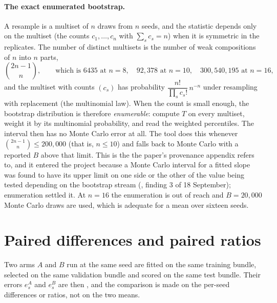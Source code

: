 \paragraph{The exact enumerated bootstrap.}
A resample is a multiset of $n$ draws from $n$ seeds, and the statistic depends only
on the multiset (the counts $c_1,\dots,c_n$ with $\sum_sc_s=n$) when it is symmetric in
the replicates. The number of distinct multisets is the number of weak compositions
of $n$ into $n$ parts,
\begin{equation}
  \binom{2n-1}{n},\qquad\text{which is }6435\text{ at }n=8,\quad 92{,}378\text{ at }n=10,\quad 300{,}540{,}195\text{ at }n=16,
\end{equation}
and the multiset with counts $(c_s)$ has probability $\dfrac{n!}{\prod_sc_s!}\,n^{-n}$
under resampling with replacement (the multinomial law). When the count is small
enough, the bootstrap distribution is therefore \emph{enumerable}: compute $T$ on every
multiset, weight it by its multinomial probability, and read the weighted percentiles.
The interval then has no Monte Carlo error at all. The tool
 does this whenever $\binom{2n-1}{n}\le200{,}000$
(that is, $n\le10$) and falls back to Monte Carlo with a reported $B$ above that limit.
This is the  the paper's provenance appendix refers to,
and it entered the project because a Monte Carlo interval for a fitted slope was found
to have its upper limit on one side or the other of the value being tested depending
on the bootstrap stream (, finding 3 of 18 September);
enumeration settled it. At $n=16$ the enumeration is out of reach and $B=20{,}000$
Monte Carlo draws are used, which is adequate for a mean over sixteen seeds.

\section{Paired differences and paired ratios}
\label{sec:paired}

Two arms $A$ and $B$ run at the same seed are fitted on the same training bundle,
selected on the same validation bundle and scored on the same test bundle. Their
errors $e^A_s$ and $e^B_s$ are then , and the comparison is made on the
per-seed differences or ratios, not on the two means.

